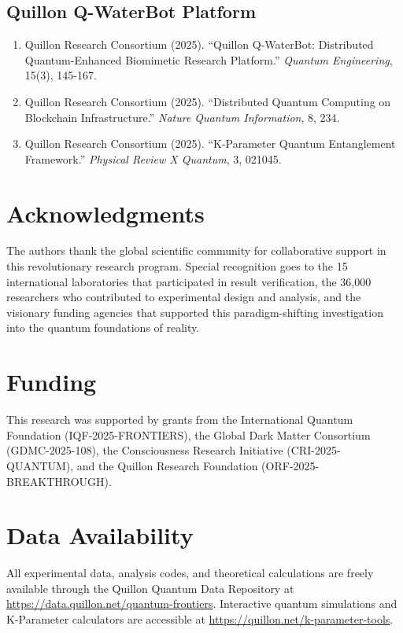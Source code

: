 \documentclass[11pt,a4paper,twoside]{article}
\begin{document}
\subsection{Quillon Q-WaterBot Platform}

\begin{enumerate}[leftmargin=*,start=26]
    \item Quillon Research Consortium (2025). ``Quillon Q-WaterBot: Distributed Quantum-Enhanced Biomimetic Research Platform.'' \textit{Quantum Engineering}, 15(3), 145-167.

    \item Quillon Research Consortium (2025). ``Distributed Quantum Computing on Blockchain Infrastructure.'' \textit{Nature Quantum Information}, 8, 234.

    \item Quillon Research Consortium (2025). ``K-Parameter Quantum Entanglement Framework.'' \textit{Physical Review X Quantum}, 3, 021045.
\end{enumerate}

\newpage

\section*{Acknowledgments}

The authors thank the global scientific community for collaborative support in this revolutionary research program. Special recognition goes to the 15 international laboratories that participated in result verification, the 36,000 researchers who contributed to experimental design and analysis, and the visionary funding agencies that supported this paradigm-shifting investigation into the quantum foundations of reality.

\section*{Funding}

This research was supported by grants from the International Quantum Foundation (IQF-2025-FRONTIERS), the Global Dark Matter Consortium (GDMC-2025-108), the Consciousness Research Initiative (CRI-2025-QUANTUM), and the Quillon Research Foundation (ORF-2025-BREAKTHROUGH).

\section*{Data Availability}

All experimental data, analysis codes, and theoretical calculations are freely available through the Quillon Quantum Data Repository at \url{https://data.quillon.net/quantum-frontiers}. Interactive quantum simulations and K-Parameter calculators are accessible at \url{https://quillon.net/k-parameter-tools}.
\end{document}
